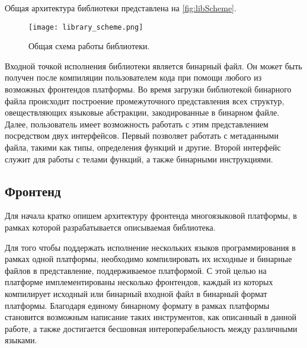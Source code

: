 Общая архитектура библиотеки представлена на \autoref{fig:libScheme}.

\begin{figure}[h]
\centering
\texttt{[image: library\_scheme.png]}
\caption{Общая схема работы библиотеки.}
\label{fig:libScheme}
\end{figure}

Входной точкой исполнения библиотеки является бинарный файл. Он может быть получен после компиляции пользователем кода при помощи любого из возможных фронтендов платформы. Во время загрузки библиотекой бинарного файла происходит построение промежуточного представления всех структур, овеществляющих языковые абстракции, закодированные в бинарном файле. Далее, пользователь имеет возможность работать с этим представлением посредством двух интерфейсов. Первый позволяет работать с метаданными файла, такими как типы, определения функций и другие. Второй интерфейс служит для работы с телами функций, а также бинарными инструкциями.

\subsection{Фронтенд}

Для начала кратко опишем архитектуру фронтенда многоязыковой платформы, в рамках которой разрабатывается описываемая библиотека.

Для того чтобы поддержать исполнение нескольких языков программирования в рамках одной платформы, необходимо компилировать их исходные и бинарные файлов в представление, поддерживаемое платформой. С этой целью на платформе имплементированы несколько фронтендов, каждый из которых компилирует исходный или бинарный входной файл в бинарный формат платформы. Благодаря единому бинарному формату в рамках платформы становится возможным написание таких инструментов, как описанный в данной работе, а также достигается бесшовная интероперабельность между различными языками.

